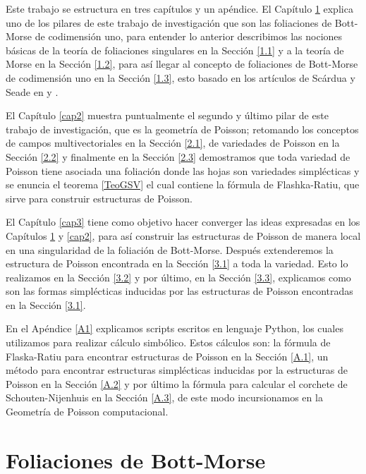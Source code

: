 \documentclass[a4paper,10pt]{book}
\begin{document}
Este trabajo se estructura en tres cap\'itulos y un ap\'endice. El Cap\'itulo \ref{cap1} explica uno de los pilares de este trabajo de investigaci\'on que son las foliaciones de Bott-Morse de codimensi\'on uno, para entender lo anterior describimos las nociones b\'asicas de la teor\'ia de foliaciones singulares en la Secci\'on \ref{1.1} y a la teor\'ia de Morse en la Secci\'on \ref{1.2}, para as\'i llegar al concepto de foliaciones de Bott-Morse de codimensi\'on uno en la Secci\'on \ref{1.3}, esto basado en los art\'iculos de Sc\'ardua y Seade en \cite{Seade1} y \cite{Seade2}.  
\vspace{5mm}

El Cap\'itulo \ref{cap2} muestra puntualmente el segundo y \'ultimo pilar de este trabajo de investigaci\'on, que es la geometr\'ia de Poisson; retomando los conceptos de campos multivectoriales en la Secci\'on \ref{2.1}, de variedades de Poisson en la Secci\'on \ref{2.2} y finalmente en la Secci\'on \ref{2.3} demostramos que toda variedad de Poisson tiene asociada una foliaci\'on donde las hojas son variedades simpl\'ecticas y se enuncia el teorema \ref{TeoGSV} el cual contiene la f\'ormula de Flashka-Ratiu, que sirve para construir estructuras de Poisson.
\vspace{5mm}         

El Cap\'itulo \ref{cap3} tiene como objetivo hacer converger las ideas expresadas en los Cap\'itulos \ref{cap1} y \ref{cap2}, para as\'i construir las estructuras de Poisson de manera local en una singularidad de la foliaci\'on de Bott-Morse. Despu\'es extenderemos la estructura de Poisson encontrada en la Secci\'on \ref{3.1} a toda la variedad. Esto lo realizamos en la Secci\'on \ref{3.2} y por \'ultimo, en la Secci\'on \ref{3.3}, explicamos como son las formas simpl\'ecticas inducidas por las estructuras de Poisson encontradas en la Secci\'on \ref{3.1}.
\vspace{5mm}

En el Ap\'endice \ref{A1} explicamos scripts escritos en lenguaje Python, los cuales utilizamos para realizar c\'alculo simb\'olico. Estos c\'alculos son: la f\'ormula de Flaska-Ratiu para encontrar estructuras de Poisson en la Secci\'on \ref{A.1}, un m\'etodo para encontrar estructuras simpl\'ecticas inducidas por la estructuras de Poisson en la Secci\'on \ref{A.2} y por \'ultimo la f\'ormula para calcular el corchete de Schouten-Nijenhuis en la Secci\'on \ref{A.3}, de este modo incursionamos en la Geometr\'ia de Poisson computacional. %

\chapter{Foliaciones de Bott-Morse}\label{cap1}%
\end{document}
